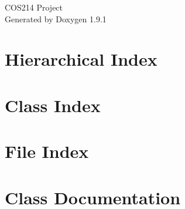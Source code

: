 \let\mypdfximage\pdfximage\def\pdfximage{\immediate\mypdfximage}\documentclass[twoside]{book}
\newcommand{\+}{\discretionary{\mbox{\scriptsize$\hookleftarrow$}}{}{}}
\newcommand{\clearemptydoublepage}{%
  \newpage{\pagestyle{empty}\cleardoublepage}%
}
\begin{document}
\raggedbottom

\hypersetup{pageanchor=false,
             bookmarksnumbered=true,
             pdfencoding=unicode
            }
\begin{titlepage}
\vspace*{7cm}
\begin{center}%
{\Large COS214 Project }\\
\vspace*{1cm}
{\large Generated by Doxygen 1.9.1}\\
\end{center}
\end{titlepage}
\clearemptydoublepage
{}
\tableofcontents
\clearemptydoublepage
{}
\hypersetup{pageanchor=true}

\chapter{Hierarchical Index}

\chapter{Class Index}

\chapter{File Index}

\chapter{Class Documentation}











































\end{document}
